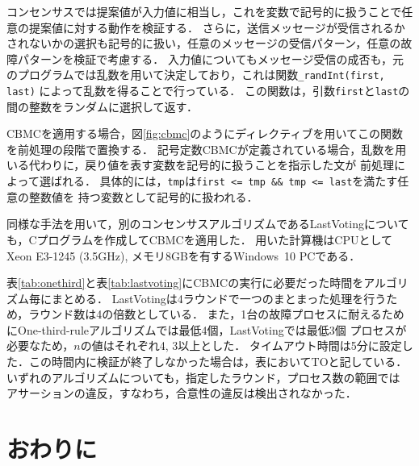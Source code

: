 \documentclass[technicalreport]{ieicej}
\theoremstyle{plain}
\begin{document}
コンセンサスでは提案値が入力値に相当し，これを変数で記号的に扱うことで任意の提案値に対する動作を検証する．
さらに，送信メッセージが受信されるかされないかの選択も記号的に扱い，任意のメッセージの受信パターン，任意の故障パターンを検証で考慮する．
入力値についてもメッセージ受信の成否も，元のプログラムでは乱数を用いて決定しており，これは関数\verb|_randInt(first, last)|
によって乱数を得ることで行っている．
この関数は，引数\verb|first|と\verb|last|の間の整数をランダムに選択して返す．

CBMCを適用する場合，図\ref{fig:cbmc}のようにディレクティブを用いてこの関数を前処理の段階で置換する．
記号定数CBMCが定義されている場合，乱数を用いる代わりに，戻り値を表す変数を記号的に扱うことを指示した文が
前処理によって選ばれる．
具体的には，\verb|tmp|は\verb|first <= tmp && tmp <= last|を満たす任意の整数値を
持つ変数として記号的に扱われる．


%

同様な手法を用いて，別のコンセンサスアルゴリズムであるLastVoting\cite{HOjournal}についても，Cプログラムを作成してCBMCを適用した．
用いた計算機はCPUとしてXeon E3-1245 (3.5GHz), メモリ8GBを有するWindows~10 PCである．

表\ref{tab:onethird}と表\ref{tab:lastvoting}にCBMCの実行に必要だった時間をアルゴリズム毎にまとめる．
LastVotingは4ラウンドで一つのまとまった処理を行うため，ラウンド数は4の倍数としている．
また，1台の故障プロセスに耐えるためにOne-third-ruleアルゴリズムでは最低4個，LastVotingでは最低3個
プロセスが必要なため，$n$の値はそれぞれ4, 3以上とした．
タイムアウト時間は5分に設定した．この時間内に検証が終了しなかった場合は，表においてTOと記している．
いずれのアルゴリズムについても，指定したラウンド，プロセス数の範囲では
アサーションの違反，すなわち，合意性の違反は検出されなかった．


\section{おわりに}\label{sec:conclusion}
\end{document}

